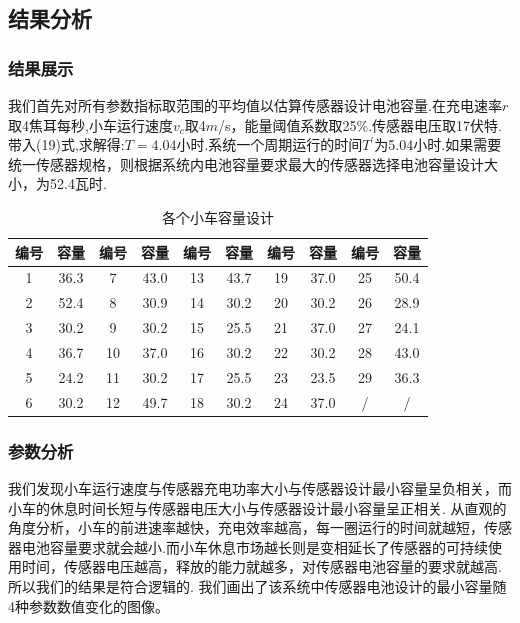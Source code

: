\documentclass{whutmod}
\begin{document}
\subsection{结果分析}
\subsubsection{结果展示}
我们首先对所有参数指标取范围的平均值以估算传感器设计电池容量.在充电速率$r$取4焦耳每秒,小车运行速度$v_{c}$取4$m$/s，能量阈值系数取25\%.传感器电压取17伏特.带入(19)式,求解得:$T=4.04$小时.系统一个周期运行的时间$T^{\prime}$为5.04小时.如果需要统一传感器规格，则根据系统内电池容量要求最大的传感器选择电池容量设计大小，为52.4瓦时.



\begin{table}[!htbp]
	\caption{各个小车容量设计}\label{canshu2} \centering
	\begin{tabular}{cccccccccc}
		\toprule[1pt]
		编号 & 容量 & 编号 & 容量 & 编号 & 容量 & 编号 & 容量 & 编号 & 容量\\
		\midrule[1pt]
		1 & 36.3  & 7 & 43.0 & 13 & 43.7 & 19 &  37.0 & 25 & 50.4\\
		2 & 52.4 & 8 &  30.9 & 14 & 30.2 & 20 & 30.2 & 26 & 28.9\\
		3 & 30.2 & 9 &  30.2 & 15 & 25.5 & 21 &  37.0 &27 & 24.1\\
		4 & 36.7 & 10 &  37.0 & 16 & 30.2 & 22 & 30.2 & 28 & 43.0\\
		5 & 24.2 & 11 &   30.2 & 17 & 25.5 & 23 & 23.5 & 29 & 36.3\\
		6 & 30.2 & 12 &   49.7 & 18 & 30.2 & 24 & 37.0  & /  & / \\
		\bottomrule[1.5pt]
	\end{tabular}
	\centering
\end{table}

\subsubsection{参数分析}
我们发现小车运行速度与传感器充电功率大小与传感器设计最小容量呈负相关，而小车的休息时间长短与传感器电压大小与传感器设计最小容量呈正相关.
从直观的角度分析，小车的前进速率越快，充电效率越高，每一圈运行的时间就越短，传感器电池容量要求就会越小.而小车休息市场越长则是变相延长了传感器的可持续使用时间，传感器电压越高，释放的能力就越多，对传感器电池容量的要求就越高.所以我们的结果是符合逻辑的.
我们画出了该系统中传感器电池设计的最小容量随4种参数数值变化的图像。
\end{document}
